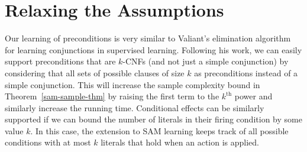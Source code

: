 \documentclass{article}
\begin{document}

\section{Relaxing the Assumptions}

Our learning of preconditions is very similar to Valiant's elimination algorithm \cite{Valiant1984} for learning conjunctions in supervised learning. 
Following his work, we can easily support preconditions that are $k$-CNFs (and not just a simple conjunction) 
by considering that all sets of possible clauses of size $k$ as preconditions instead of a simple conjunction. 
This will increase the sample complexity bound in Theorem~\ref{sam-sample-thm} by raising the first term to the $k^{\text{th}}$ power and similarly increase the running time.
Conditional effects can be similarly supported if we can bound the number of literals in their firing condition by some value $k$. 
In this case, the extension to SAM learning keeps track of all possible conditions with at most $k$ literals that hold when an action is applied. 
\end{document}
